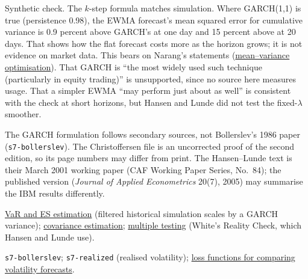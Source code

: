 \begin{qfmodel}
 Synthetic check. The $k$-step formula matches simulation. Where GARCH(1,1) is true (persistence 0.98), the EWMA forecast's mean squared error for cumulative variance is 0.9 percent above GARCH's at one day and 15 percent above at 20 days. That shows how the flat forecast costs more as the horizon grows; it is not evidence on market data. This bears on Narang's statements (\hyperref[mod:mean-variance-portfolio-optimisation]{mean--variance optimisation}). That GARCH is ``the most widely used such technique (particularly in equity trading)'' is unsupported, since no source here measures usage. That a simpler EWMA ``may perform just about as well'' is consistent with the check at short horizons, but Hansen and Lunde did not test the fixed-$\lambda$ smoother.

 The GARCH formulation follows secondary sources, not Bollerslev's 1986 paper (\nolinkurl{s7-bollerslev}). The Christoffersen file is an uncorrected proof of the second edition, so its page numbers may differ from print. The Hansen--Lunde text is their March 2001 working paper (CAF Working Paper Series, No.~84); the published version (\emph{Journal of Applied Econometrics} 20(7), 2005) may summarise the IBM results differently.

 \hyperref[meth:var-es-estimation-methods]{VaR and ES estimation} (filtered historical simulation scales by a GARCH variance); \hyperref[meth:portfolio-covariance-estimation]{covariance estimation}; \hyperref[meth:multiple-testing-control]{multiple testing} (White's Reality Check, which Hansen and Lunde use).

 \nolinkurl{s7-bollerslev}; \nolinkurl{s7-realized} (realised volatility); \hyperref[meth:volatility-forecast-loss]{loss functions for comparing volatility forecasts}.

\end{qfmodel}


